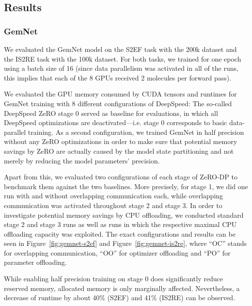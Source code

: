 \subsection{Results}

\subsubsection{GemNet}

We evaluated the GemNet model on the S2EF task with the 200k dataset and
the IS2RE task with the 100k dataset. For both tasks, we trained for one epoch
using a batch size of 16 (since data parallelism was activated in all of the 
runs, this implies that each of the 8 GPUs received 2 molecules per forward pass). 

We evaluated the GPU memory consumed by CUDA tensors and runtimes for GemNet training with 8 different 
configurations of DeepSpeed:
The so-called DeepSpeed ZeRO stage 0 served as baseline for evaluations, in which 
all DeepSpeed optimizations are deactivated---i.e. stage 0 corresponds to basic 
data-parallel training. As a second configuration, we trained GemNet 
in half precision without any ZeRO optimizations in order to make sure that
potential memory savings by ZeRO are actually caused by the model state partitioning and
not merely by reducing the model parameters' precision.

Apart from this, we evaluated two configurations of each stage of ZeRO-DP to benchmark 
them against the two baselines. More precisely, for stage 1, we did one run with and 
without overlapping communication each, while overlapping communication
was activated throughout stage 2 and stage 3. In order to investigate potential 
memory savings by CPU offloading, we conducted standard stage 2 and stage 3 runs as well
as runs in which the respective maximal CPU offloading capacity was exploited.
The exact configurations and results can be seen in Figure~\ref{fig:gemnet-s2ef}
and Figure~\ref{fig:gemnet-is2re}, where \enquote{OC} stands for overlapping communication,
\enquote{OO} for optimizer offloading and \enquote{PO} for parameter offloading.

While enabling half precision training on stage 0 does significantly reduce 
reserved memory, allocated memory is only marginally affected. Nevertheless, 
a decrease of runtime by about 40\% (S2EF) and 41\% (IS2RE) can be observed.

